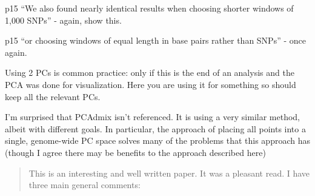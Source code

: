 
\begin{point}{p15}
``We also found nearly identical results when choosing shorter windows of 1,000 SNPs'' - again, show this.
\end{point}


\begin{point}{p15}
 ``or choosing windows of equal length in base pairs rather than SNPs'' - once again.
\end{point}


\begin{point}{}
Using 2 PCs is common practice: only if this is the end of an analysis and the
PCA was done for visualization. Here you are using it for something so should
keep all the relevant PCs.
\end{point}


\begin{point}{}
I'm surprised that PCAdmix isn't referenced. It is using a very similar
method, albeit with different goals. In particular, the approach of placing all
points into a single, genome-wide PC space solves many of the problems that this
approach has (though I agree there may be benefits to the approach described here)
\end{point}



\begin{quote}
    This is an interesting and well written paper. It was a pleasant read. I have three main general
    comments:
\end{quote}


